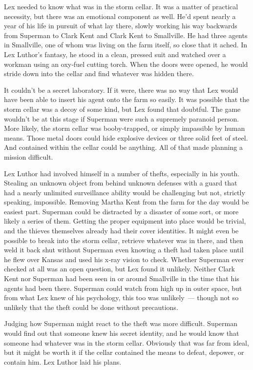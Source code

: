\documentclass[ebook,12pt]{memoir}
\begin{document}
Lex needed to know what was in the storm cellar. It was a matter of
practical necessity, but there was an emotional component as well. He'd
spent nearly a year of his life in pursuit of what lay there, slowly
working his way backwards from Superman to Clark Kent and Clark Kent to
Smallville. He had three agents in Smallville, one of whom was living on
the farm itself, so close that it ached. In Lex Luthor's fantasy, he
stood in a clean, pressed suit and watched over a workman using an
oxy‐fuel cutting torch. When the doors were opened, he would stride down
into the cellar and find whatever was hidden there.

It couldn't be a secret laboratory. If it were, there was no way that
Lex would have been able to insert his agent onto the farm so easily. It
was possible that the storm cellar was a decoy of some kind, but Lex
found that doubtful. The game wouldn't be at this stage if Superman were
such a supremely paranoid person. More likely, the storm cellar was
booby‐trapped, or simply impassible by human means. Those metal doors
could hide explosive devices or three solid feet of steel. And contained
within the cellar could be anything. All of that made planning a mission
difficult.

Lex Luthor had involved himself in a number of thefts, especially in his
youth. Stealing an unknown object from behind unknown defenses with a
guard that had a nearly unlimited surveillance ability would be
challenging but not, strictly speaking, impossible. Removing Martha Kent
from the farm for the day would be easiest part. Superman could be
distracted by a disaster of some sort, or more likely a series of them.
Getting the proper equipment into place would be trivial, and the
thieves themselves already had their cover identities. It might even be
possible to break into the storm cellar, retrieve whatever was in there,
and then weld it back shut without Superman even knowing a theft had
taken place until he flew over Kansas and used his x‐ray vision to
check. Whether Superman ever checked at all was an open question, but
Lex found it unlikely. Neither Clark Kent nor Superman had been seen in
or around Smallville in the time that his agents had been there.
Superman could watch from high up in outer space, but from what Lex knew
of his psychology, this too was unlikely~--- though not so unlikely that
the theft could be done without precautions.

Judging how Superman might react to the theft was more difficult.
Superman would find out that someone knew his secret identity, and he
would know that someone had whatever was in the storm cellar. Obviously
that was far from ideal, but it might be worth it if the cellar
contained the means to defeat, depower, or contain him. Lex Luthor laid
his plans.
\end{document}
